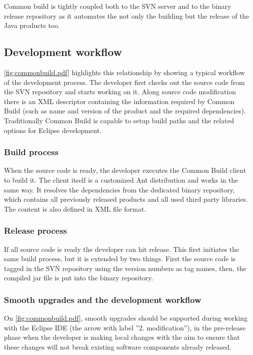 Common build is tightly coupled both to the SVN server and to the binary release
repository as it automates the not only the building but the release of the
Java products too.

\subsection{Development workflow}
\autoref{fig:commonbuild.pdf} highlights this relationship by showing a typical
workflow of the development process. The developer first checks out the source
code from the SVN repository and starts working on it. Along source code
modification there is an XML descriptor containing the information required by
Common Build (such as name and version of the product and the required
dependencies). Traditionally Common Build is capable to setup build paths and the related
options for Eclipse development. 

\subsubsection{Build process}
When the source code is ready, the developer executes the Common Build client to
build it. The client itself is a customized Ant distribution and works in the
same way. It resolves the dependencies from the dedicated binary repository,
which contains all previously released products and all used third party
libraries. The content is also defined in XML file format.

\subsubsection{Release process}
If all source code is ready the developer can hit release. This first initiates
the same build process, but it is extended by two things. First the source code
is tagged in the SVN repository using the version numbers as tag names, then, the
compiled jar file is put into the binary repository. 

\subsubsection{Smooth upgrades and the development workflow}
On \autoref{fig:commonbuild.pdf}, smooth upgrades should be supported during working
with the Eclipse IDE (the arrow with label ''2. modification''), in the pre-release phase when the
developer is making local changes with the aim to ensure that these changes will
not break existing software components already released.


